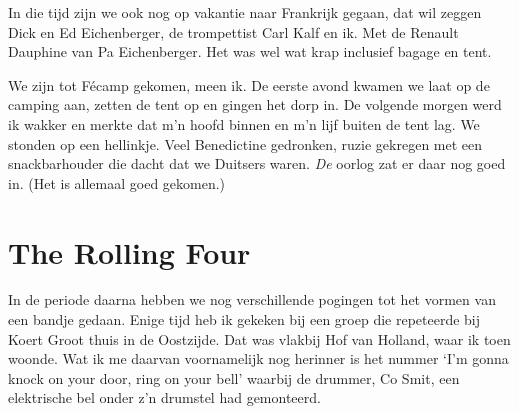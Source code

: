 \documentclass[12pt,twoside, openright]{memoir}
\begin{document}
In die tijd zijn we ook nog op vakantie naar Frankrijk gegaan, dat wil zeggen Dick en Ed Eichenberger, de trompettist Carl Kalf en ik. Met de Renault Dauphine van Pa Eichenberger. Het was wel wat krap inclusief bagage en tent. 

We zijn tot Fécamp gekomen, meen ik. De eerste avond kwamen we laat op de camping aan, zetten de tent op en gingen het dorp in. De volgende morgen werd ik wakker en merkte dat m’n hoofd binnen en m'n lijf buiten de tent lag. We stonden op een hellinkje. Veel Benedictine gedronken, ruzie gekregen met een snackbarhouder die dacht dat we Duitsers waren. \emph{De} oorlog zat er daar nog goed in. (Het is allemaal goed gekomen.)

\section*{The Rolling Four} %
\label{cha:rollingfour}

In de periode daarna hebben we nog verschillende pogingen tot het vormen van een bandje gedaan. Enige tijd heb ik gekeken bij een groep die repeteerde bij Koert Groot thuis in de Oostzijde. Dat was vlakbij Hof van Holland, waar ik toen woonde. Wat ik me daarvan voornamelijk nog herinner is het nummer `I’m gonna knock on your door, ring on your bell' waarbij de drummer, Co Smit, een elektrische bel onder z’n drumstel had gemonteerd.
\end{document}
